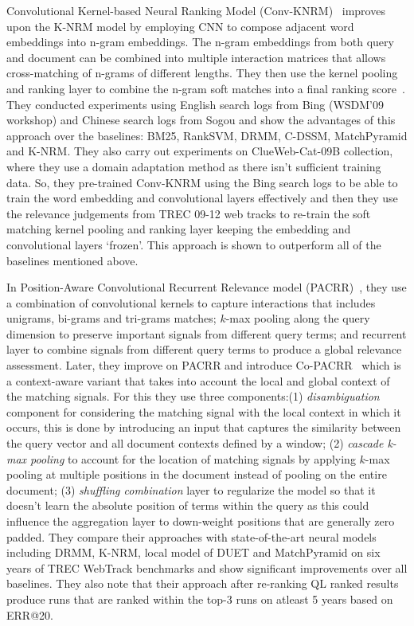 \textsf{Convolutional Kernel-based Neural Ranking Model} (Conv-KNRM)~\citep{ConvKNRM18} improves upon the K-NRM model by employing CNN to compose adjacent word embeddings into n-gram embeddings. The n-gram embeddings from both query and document can be combined into multiple interaction matrices that allows cross-matching of n-grams of different lengths. They then use the kernel pooling and ranking layer to combine the n-gram soft matches into a final ranking score~\citep{KNRM17}. They conducted experiments using English search logs from Bing (WSDM'09 workshop) and Chinese search logs from Sogou and show the advantages of this approach over the baselines: BM25, RankSVM, DRMM, C-DSSM, MatchPyramid and K-NRM. They also carry out experiments on ClueWeb-Cat-09B collection, where they use a domain adaptation method as there isn't sufficient training data. So, they pre-trained Conv-KNRM using the Bing search logs to be able to train the word embedding and convolutional layers effectively and then they use the relevance judgements from TREC 09-12 web tracks to re-train the soft matching kernel pooling and ranking layer keeping the embedding and convolutional layers `frozen'. This approach is shown to outperform all of the baselines mentioned above.

In \textsf{Position-Aware Convolutional Recurrent Relevance model} (PACRR)~\citep{pacrr17}, they use a combination of convolutional kernels to capture interactions that includes unigrams, bi-grams and tri-grams matches; $k$-max pooling along the query dimension to preserve important signals from different query terms; and recurrent layer to combine signals from different query terms to produce a global relevance assessment. Later, they improve on PACRR and introduce Co-PACRR~\citep{co_pacrr_wsdm18} which is a context-aware variant that takes into account the local and global context of the matching signals. For this they use three components:(1) \textit{disambiguation} component for considering the matching signal with the local context in which it occurs, this is done by introducing an input that captures the similarity between the query vector and all document contexts defined by a window; (2) \textit{cascade k-max pooling} to account for the location of matching signals by applying $k$-max pooling at multiple positions in the document instead of pooling on the entire document; (3) \textit{shuffling combination} layer to regularize the model so that it doesn't learn the absolute position of terms within the query as this could influence the aggregation layer to down-weight positions that are generally zero padded. They compare their approaches with state-of-the-art neural models including DRMM, K-NRM, local model of DUET and MatchPyramid on six years of TREC WebTrack benchmarks and show significant improvements over all baselines. They also note that their approach after re-ranking QL ranked results produce runs that are ranked within the top-3 runs on atleast 5 years based on ERR@20. %


